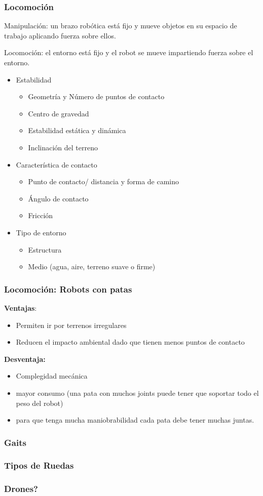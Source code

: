 \begin{frame}
    \frametitle{Locomoción}

    Manipulación: un brazo robótica está fijo y mueve objetos en su espacio de trabajo aplicando fuerza sobre ellos.

    Locomoción: el entorno está fijo y el robot se mueve impartiendo fuerza sobre el entorno.
    \begin{itemize}
        \item Estabilidad
        \begin{itemize}
            \item Geometría y Número de puntos de contacto
            \item Centro de gravedad
            \item Estabilidad estática y dinámica
            \item Inclinación del terreno
        \end{itemize}
        \item Característica de contacto
        \begin{itemize}
            \item Punto de contacto/ distancia y forma de camino
            \item Ángulo de contacto
            \item Fricción
        \end{itemize}
        \item Tipo de entorno
        \begin{itemize}
            \item Estructura
            \item Medio (agua, aire, terreno suave o firme)
        \end{itemize}
    \end{itemize}
\end{frame}

\begin{frame}
    \frametitle{Locomoción: Robots con patas}
    {\bf Ventajas}:
    \begin{itemize}
        \item Permiten ir por terrenos irregulares
        \item Reducen el impacto ambiental dado que tienen menos puntos de contacto
    \end{itemize}
    {\bf Desventaja: }
    \begin{itemize}
        \item Complegidad mecánica
        \item mayor consumo (una pata con muchos joints puede tener que soportar todo el peso del robot)
        \item para que tenga mucha maniobrabilidad cada pata debe tener muchas juntas.
\end{itemize}

\end{frame}


\begin{frame}
    \frametitle{Gaits}

\end{frame}


\begin{frame}
    \frametitle{Tipos de Ruedas}

\end{frame}

\begin{frame}
    \frametitle{Drones?}

\end{frame}
